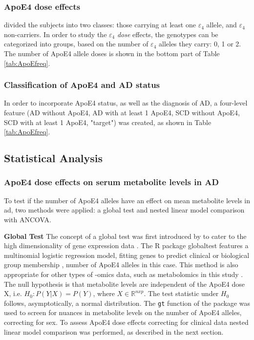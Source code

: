\documentclass{amsart}
\begin{document}
\subsubsection{ApoE4 dose effects}
\citeauthor{deLeeuw2017Blood-basedDisease} divided the subjects into two classes: those carrying at least one $\varepsilon_4$ allele, and $\varepsilon_4$ non-carriers. In order to study the $\varepsilon_4$ \textit{dose} effects, the genotypes can be categorized into groups, based on the number of $\varepsilon_4$ alleles they carry: 0, 1 or 2. The number of ApoE4 allele doses is shown in the bottom part of Table \ref{tab:ApoEfreq}.

\subsubsection{Classification of ApoE4 and AD status}
In order to incorporate ApoE4 status, as well as the diagnosis of AD, a four-level feature (AD without ApoE4, AD with at least 1 ApoE4, SCD without ApoE4, SCD with at least 1 ApoE4, "target") was created, as shown in Table \ref{tab:ApoEfreq}.

\subsection{Statistical Analysis} \label{stats}
\subsubsection{ApoE4 dose effects on serum metabolite levels in AD} \label{rq1}
To test if the number of ApoE4 alleles have an effect on mean metabolite levels in \acrshort{ad}, two methods were applied: a global test and nested linear model comparison with ANCOVA.

\leavevmode\newline\textbf{Global Test}\hspace{.25cm} The concept of a global test was first introduced by \citeauthor{Simon2004DesignHealth} to cater to the high dimensionality of gene expression data \cite{Simon2004DesignHealth}. The R package \textsf{globaltest} features a multinomial logistic regression model, fitting genes to predict clinical or biological group membership \cite{Goeman2004AOutcome, Goeman2006TestingAlternative, Goeman2023ThePackage}, number of ApoE4 alleles in this case. This method is also appropriate for other types of -omics data, such as metabolomics in this study \cite{Goeman2023ThePackage}. The null hypothesis is that metabolite levels are independent of the ApoE4 dose X, i.e. $H_0 : P(Y|X) = P(Y)$, where $X \in \mathbb{R}^{n x p}$. The test statistic under $H_0$ follows, asymptotically, a normal distribution. The \texttt{gt} function of the package was used to screen for nuances in metabolite levels on the number of ApoE4 alleles, correcting for sex. To assess ApoE4 dose effects correcting for clinical data nested linear model comparison was performed, as described in the next section.
\end{document}
